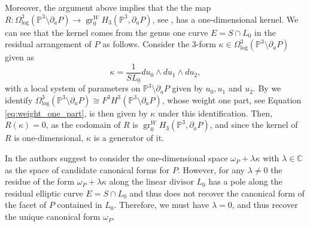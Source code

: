 \documentclass[12pt]{extarticle}
\theoremstyle{definition}
\theoremstyle{theorem}
\theoremstyle{remark}
\numberwithin{equation}{section}
\newcommand{\C}{\mathbb{C}}
\newcommand{\PP}{\mathbb{P}}
\begin{document}
Moreover, the argument above implies that the the map $R:\Omega^3_{\log}(\PP^3\setminus\partial_a P)\rightarrow \operatorname{gr}^W_0H_3(\PP^3,\partial_a P)$, see \cite[Definition 2.4]{brown-dupont}, has a one-dimensional kernel.
We can see that the kernel comes from the genus one curve $E=S\cap L_0$ in the residual arrangement of $P$ as follows.
Consider the $3$-form $\kappa\in \Omega^3_{\log}(\PP^3\setminus\partial_a P)$ given as 
\[
\kappa = \frac{1}{SL_0}du_0\wedge du_1 \wedge du_2,
\]
with a local system of parameters on $\PP^3\setminus\partial_a P$ given by $u_0, u_1$ and $u_2$.
By \cite[Equation (21)]{brown-dupont} we identify $\Omega^3_{\log}(\PP^3\setminus\partial_a P)\cong F^3H^3(\PP^3\setminus\partial_a P)$, whose weight one part, see Equation \eqref{eq:weight_one_part}, is then given by $\kappa$ under this identification.
Then, $R(\kappa)=0$, as the codomain of $R$ is $\operatorname{gr}^W_0H_3(\PP^3,\partial_aP)$, and since the kernel of $R$ is one-dimensional, $\kappa$ is a generator of it.

In \cite[Section 2.7]{brown-dupont} the authors suggest to consider the one-dimensional space $\omega_P+\lambda\kappa$ with $\lambda\in \C$ as the space of candidate canonical forms for $P$.
However, for any $\lambda\neq 0$ the residue of the form $\omega_P+\lambda\kappa$ along the linear divisor $L_0$ has a pole along the residual elliptic curve $E=S\cap L_0$ and thus does not recover the canonical form of the facet of $P$ contained in $L_0$.
Therefore, we must have $\lambda=0$, and thus recover the unique canonical form $\omega_P$.
\end{document}
